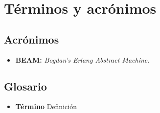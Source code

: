 \section{Términos y acrónimos}
\label{section:terminos-acronimos}

\subsection{Acrónimos}

 \begin{itemize}
    \item \textbf{BEAM:} \textit{Bogdan's Erlang Abstract Machine}.
\end{itemize}


\subsection{Glosario}

\begin{itemize}
    \item \textbf{Término} Definición
\end{itemize}
